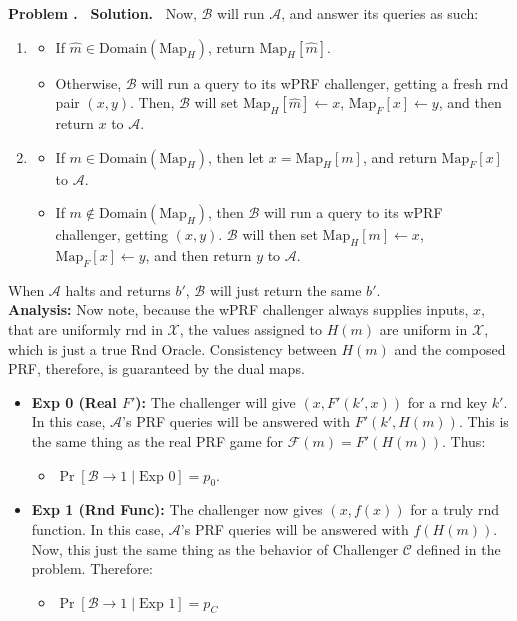 \documentclass[12pt]{article}
\theoremstyle{definition}
\newcommand{\addbigskip}{\addvspace{\bigskipamount}}
\newcounter{problemnum}
\newenvironment{problem}
     {\addbigskip \setcounter{partnum}{0}
      \noindent\stepcounter{problemnum}\textbf{Problem
                                             \arabic{problemnum}.\ }}
     {\par\addbigskip}
\newenvironment{solution}
     {\addbigskip
      \noindent\color{blue}\textbf{Solution.\ }}
     {\par\addbigskip}
\newenvironment{solution}
     {\comment}
     {\endcomment}
\newcounter{partnum}
\newcommand{\X}{\mathcal{X}}
\begin{document}
\begin{problem}
\begin{solution}
\noindent
Now, $\mathcal{B}$ will run $\mathcal{A}$, and answer its queries as such:
\begin{enumerate}
    \item[RO Query $\hat{m}$]
    \begin{itemize}
      \item If $\hat{m} \in \text{Domain}(\text{Map}_H)$, return $\text{Map}_H[\hat{m}]$.
      \item Otherwise, $\mathcal{B}$ will run a query to its wPRF challenger, getting a fresh rnd pair $(x, y)$.
      Then, $\mathcal{B}$ will set $\text{Map}_H[\hat{m}] \leftarrow x$, $\text{Map}_F[x] \leftarrow y$, and then return $x$ to $\mathcal{A}$.
    \end{itemize}
    \item[PRF Query $m$]
    \begin{itemize}
      \item If $m \in \text{Domain}(\text{Map}_H)$, then let $x = \text{Map}_H[m]$, and return $\text{Map}_F[x]$ to $\mathcal{A}$.
      \item If $m \notin \text{Domain}(\text{Map}_H)$, then $\mathcal{B}$ will run a query to its wPRF challenger, getting $(x, y)$.
      $\mathcal{B}$ will then set $\text{Map}_H[m] \leftarrow x$, $\text{Map}_F[x] \leftarrow y$, and then return $y$ to $\mathcal{A}$.
    \end{itemize}
\end{enumerate}
\noindent
When $\mathcal{A}$ halts and returns $b'$, $\mathcal{B}$ will just return the same $b'$.\\

\noindent\textbf{Analysis:}
Now note, because the wPRF challenger always supplies inputs, $x$, that are uniformly rnd in $\X$, the values assigned to $H(m)$ are uniform in $\X$, which is just a true Rnd Oracle.
Consistency between $H(m)$ and the composed PRF, therefore, is guaranteed by the dual maps.

\begin{itemize}
    \item \textbf{Exp 0 (Real $F'$):} The challenger will give $(x, F'(k', x))$ for a rnd key $k'$.
    In this case, $\mathcal{A}$'s PRF queries will be answered with $F'(k', H(m))$.
    This is the same thing as the real PRF game for $\mathcal{F}(m) = F'(H(m))$.
    Thus:
    \begin{itemize}
      \item $\Pr[\mathcal{B} \to 1 \mid \text{Exp } 0] = p_0$.
    \end{itemize}
    \item \textbf{Exp 1 (Rnd Func):} The challenger now gives $(x, f(x))$ for a truly rnd function.
    In this case, $\mathcal{A}$'s PRF queries will be answered with $f(H(m))$.
    Now, this just the same thing as the behavior of Challenger $\mathcal{C}$ defined in the problem.
    Therefore:
    \begin{itemize}
      \item $\Pr[\mathcal{B} \to 1 \mid \text{Exp } 1] = p_C$\\
    \end{itemize}
\end{itemize}


\end{solution}
\end{problem}
\end{document}
